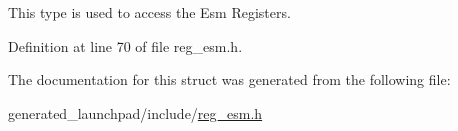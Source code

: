 This type is used to access the Esm Registers. 

Definition at line 70 of file reg\+\_\+esm.\+h.



The documentation for this struct was generated from the following file\+:\begin{DoxyCompactItemize}
\item 
generated\+\_\+launchpad/include/\mbox{\hyperlink{reg__esm_8h}{reg\+\_\+esm.\+h}}\end{DoxyCompactItemize}
